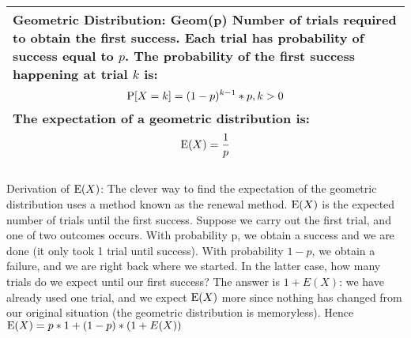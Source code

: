 {\tabulinesep=1mm
\begin{tabu}{|p{16cm} |}
\hline
\vspace{1 mm}
\textbf{Geometric Distribution: Geom(p)}
Number of trials required to obtain the first success. Each trial has 
probability of success equal to $p$. The probability of the first success 
happening at trial $k$ is:
\[ \P[X = k] = (1 - p)^{k - 1}*p, k > 0\]
The expectation of a geometric distribution is:
\[\E(X) = \frac{1}{p}\]
\vspace{1 mm}
\\
\hline
\end{tabu}
}

\begin{solution} %
Derivation of $\E(X)$:
The clever way to find the expectation of the geometric distribution 
uses a method known as the renewal method. $\E(X)$ is the expected number 
of trials until the first success. Suppose we carry out the first trial,
and one of two outcomes occurs. With probability p, we obtain a success 
and we are done (it only took 1 trial until success). With probability 
$1 - p$, we obtain a failure, and we are right back where we started. 
In the latter case, how many trials do we expect until our first success? 
The answer is $1 + E(X)$: we have already used one trial, and we expect 
$\E(X)$ more since nothing has changed from our original situation 
(the geometric distribution is memoryless). Hence 
$\E(X) = p * 1 + (1 - p) * (1 + E(X))$
\end{solution}